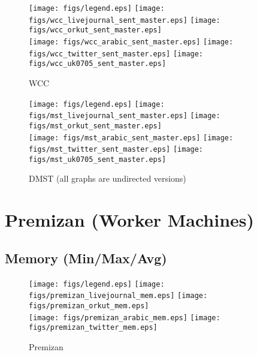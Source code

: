 \documentclass{article}
\newcommand{\bline}[1][1]{\vspace{#1\baselineskip}}
\begin{document}
\begin{figure}[!h]
  \bline[3.5]
  \centering
  \texttt{[image: figs/legend.eps]}\hspace{3em}%
  \texttt{[image: figs/wcc\_livejournal\_sent\_master.eps]}\hspace{1em}%
  \texttt{[image: figs/wcc\_orkut\_sent\_master.eps]}\\
  \texttt{[image: figs/wcc\_arabic\_sent\_master.eps]}\hspace{1em}%
  \texttt{[image: figs/wcc\_twitter\_sent\_master.eps]}\hspace{1em}%
  \texttt{[image: figs/wcc\_uk0705\_sent\_master.eps]}
  \caption{WCC}
\end{figure}

\begin{figure}[!h]
  \bline[3.5]
  \centering
  \texttt{[image: figs/legend.eps]}\hspace{3em}%
  \texttt{[image: figs/mst\_livejournal\_sent\_master.eps]}\hspace{1em}%
  \texttt{[image: figs/mst\_orkut\_sent\_master.eps]}\\
  \texttt{[image: figs/mst\_arabic\_sent\_master.eps]}\hspace{1em}%
  \texttt{[image: figs/mst\_twitter\_sent\_master.eps]}\hspace{1em}%
  \texttt{[image: figs/mst\_uk0705\_sent\_master.eps]}
  \caption{DMST (all graphs are undirected versions)}
\end{figure}

\pagebreak
\section{Premizan (Worker Machines)}
\label{sec:premizan}
\subsection{Memory (Min/Max/Avg)}
\begin{figure}[!h]
  \centering
  \texttt{[image: figs/legend.eps]}\hspace{3em}%
  \texttt{[image: figs/premizan\_livejournal\_mem.eps]}\hspace{1em}%
  \texttt{[image: figs/premizan\_orkut\_mem.eps]}\\
  \texttt{[image: figs/premizan\_arabic\_mem.eps]}\hspace{1em}%
  \texttt{[image: figs/premizan\_twitter\_mem.eps]}
  \caption{Premizan}
\end{figure}
\end{document}
